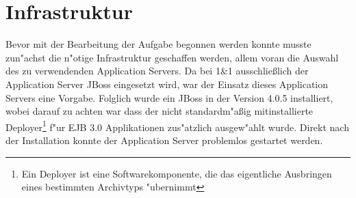\section{Infrastruktur}
\label{sec:chap2:infra}

Bevor mit der Bearbeitung der Aufgabe begonnen werden konnte musste zun"achst die n"otige Infrastruktur
geschaffen werden, allem voran die Auswahl des zu verwendenden Application Servers.
Da bei 1\&1 ausschlie\ss lich der Application Server JBoss \cite{JBOSSHP} eingesetzt wird, war der Einsatz
dieses Application Servers eine Vorgabe.
Folglich wurde ein JBoss in der Version 4.0.5 installiert, wobei darauf zu achten war dass der
nicht standardm"a\ss ig mitinstallierte Deployer\footnote{
Ein Deployer ist eine Softwarekomponente, die das eigentliche Ausbringen eines bestimmten Archivtyps "ubernimmt
} f"ur EJB 3.0 Applikationen zus"atzlich ausgew"ahlt wurde.
Direkt nach der Installation konnte der Application Server problemlos gestartet werden.

